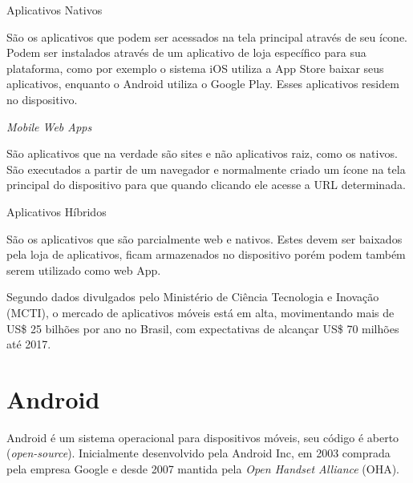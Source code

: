 \begin{alineascomponto}

\item Aplicativos Nativos

São os aplicativos que podem ser acessados na tela principal através de seu ícone. Podem ser instalados através de um aplicativo de loja específico para sua plataforma, como por exemplo o sistema iOS utiliza a App Store baixar seus aplicativos, enquanto o Android utiliza o Google Play. Esses aplicativos residem no dispositivo.

\item \textit{Mobile Web Apps}

São aplicativos que na verdade são sites e não aplicativos raiz, como os nativos. São executados a partir de um navegador e normalmente criado um ícone na tela principal do dispositivo para que quando clicando ele acesse a URL determinada.

\item Aplicativos Híbridos

São os aplicativos que são parcialmente web e nativos.
Estes devem ser baixados pela loja de aplicativos, ficam armazenados no dispositivo porém podem também serem utilizado como web App.

	\end{alineascomponto} 
	
Segundo dados divulgados pelo Ministério de Ciência Tecnologia e Inovação (MCTI), o mercado de aplicativos móveis está em alta, movimentando mais de US\$ 25 bilhões por ano no Brasil, com expectativas de alcançar US\$ 70 milhões até 2017. \cite{mcti}
	
	

	

\section{Android}
\label{sec:Android}
Android é um sistema operacional para dispositivos móveis, seu código é aberto (\textit{open-source}). Inicialmente desenvolvido pela Android Inc, em 2003 comprada pela empresa Google e desde 2007 mantida pela \textit{Open Handset Alliance} (OHA).

